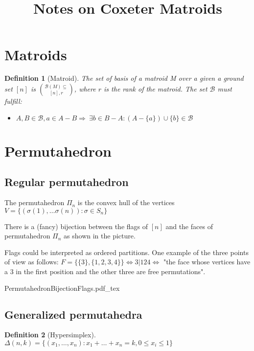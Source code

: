 \documentclass{myclass}
\title{Notes on Coxeter Matroids}
\newtheorem*{definition}{Definition}
\newcommand{\incfig}[1]{%
\center
\def\svgwidth{0.9\columnwidth}
{#1.pdf_tex}
}
\begin{document}
\maketitle
\tableofcontents
\newpage

\section{Matroids}
\begin{definition}[Matroid]
The set of basis of a matroid M over a given a ground set $[n]$ is $\mathcal{B}(M)\subseteq \choose{[n], r}$, where $r$ is the rank of the matroid. The set  $\mathcal{B}$ must fulfill:
\begin{itemize}[topsep=-6pt, itemsep=0pt]
  \item $A, B \in \mathcal{B}, a\in A-B \Rightarrow \ \exists b\in B-A : (A-\{a\})\cup \{b\}\in \mathcal{B}$
\end{itemize}
\end{definition}

\section{Permutahedron}
\subsection{Regular permutahedron}
The permutahedron $\Pi_n$ is the convex hull of the vertices $V = \{(\sigma(1), \ldots \sigma (n)) : \sigma \in S_n \}$

There is a (fancy) bijection between the flags of $[n]$ and the faces of permutahedron $\Pi_n$ as shown in the picture.

Flags could be interpreted as ordered partitions. One example of the three points of view as follows: $F = \{\{3\}, \{1, 2, 3, 4\}\} \iff 3|124 \iff$ "the face whose vertices have a $3$ in the first position and the other three are free permutations".

\begin{minipage}{\textwidth}
\incfig{PermutahedronBijectionFlags}
\end{minipage}

\subsection{Generalized permutahedra}

\begin{definition}[Hypersimplex] 
  $\Delta(n, k)=\{(x_1, \ldots, x_n): x_1 + \ldots+ x_n = k, 0\le x_i\le 1\}$
\end{definition}
\end{document}
